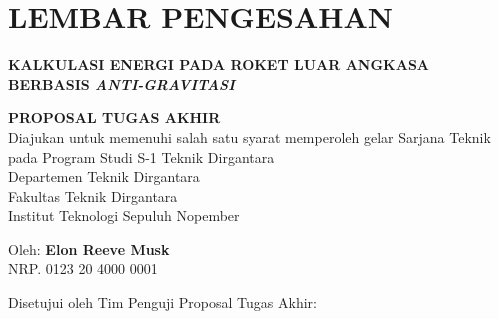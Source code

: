 \chapter*{LEMBAR PENGESAHAN}

\thispagestyle{empty}

\begin{center}
  \textbf{KALKULASI ENERGI PADA ROKET LUAR ANGKASA BERBASIS \emph{ANTI-GRAVITASI}}
\end{center}

\begingroup
  \small

  \begin{center}
    \textbf{PROPOSAL TUGAS AKHIR} \\
    Diajukan untuk memenuhi salah satu syarat memperoleh gelar
    Sarjana Teknik pada 
    Program Studi S-1 Teknik Dirgantara \\
    Departemen Teknik Dirgantara \\
    Fakultas Teknik Dirgantara \\
    Institut Teknologi Sepuluh Nopember
  \end{center}

  \begin{center}
    Oleh: \textbf{Elon Reeve Musk} \\
    NRP. 0123 20 4000 0001
  \end{center}

  \begin{center}
    Disetujui oleh Tim Penguji Proposal Tugas Akhir:
  \end{center}

  \vspace{10$ex}

  \begingroup
    \setlength{\tabcolsep}{0pt}

